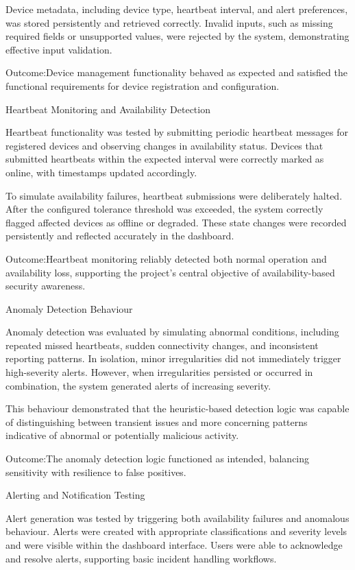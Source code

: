 Device metadata, including device type, heartbeat interval, and alert preferences, was stored persistently and retrieved correctly. Invalid inputs, such as missing required fields or unsupported values, were rejected by the system, demonstrating effective input validation.

Outcome:Device management functionality behaved as expected and satisfied the functional requirements for device registration and configuration.

Heartbeat Monitoring and Availability Detection

Heartbeat functionality was tested by submitting periodic heartbeat messages for registered devices and observing changes in availability status. Devices that submitted heartbeats within the expected interval were correctly marked as online, with timestamps updated accordingly.

To simulate availability failures, heartbeat submissions were deliberately halted. After the configured tolerance threshold was exceeded, the system correctly flagged affected devices as offline or degraded. These state changes were recorded persistently and reflected accurately in the dashboard.

Outcome:Heartbeat monitoring reliably detected both normal operation and availability loss, supporting the project's central objective of availability-based security awareness.

Anomaly Detection Behaviour

Anomaly detection was evaluated by simulating abnormal conditions, including repeated missed heartbeats, sudden connectivity changes, and inconsistent reporting patterns. In isolation, minor irregularities did not immediately trigger high-severity alerts. However, when irregularities persisted or occurred in combination, the system generated alerts of increasing severity.

This behaviour demonstrated that the heuristic-based detection logic was capable of distinguishing between transient issues and more concerning patterns indicative of abnormal or potentially malicious activity.

Outcome:The anomaly detection logic functioned as intended, balancing sensitivity with resilience to false positives.

Alerting and Notification Testing

Alert generation was tested by triggering both availability failures and anomalous behaviour. Alerts were created with appropriate classifications and severity levels and were visible within the dashboard interface. Users were able to acknowledge and resolve alerts, supporting basic incident handling workflows.

